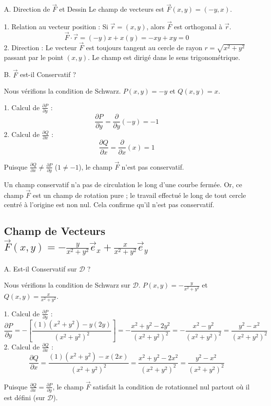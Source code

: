 \documentclass[french]{yLectureNote}
\renewcommand{\vec}{\overrightarrow}
\begin{document}
A. Direction de $\vec{F}$ et Dessin
Le champ de vecteurs est $\vec{F}(x,y) = (-y, x)$.

1.  Relation au vecteur position : Si $\vec{r} = (x, y)$, alors $\vec{F}$ est orthogonal à $\vec{r}$.
    $$
    \vec{F} \cdot \vec{r} = (-y)x + x(y) = -xy + xy = 0
    $$
2.  Direction : Le vecteur $\vec{F}$ est toujours tangent au cercle de rayon $r = \sqrt{x^2+y^2}$ passant par le point $(x,y)$. Le champ est dirigé dans le sens trigonométrique.



B. $\vec{F}$ est-il Conservatif ?

Nous vérifions la condition de Schwarz.
$P(x,y) = -y$ et $Q(x,y) = x$.

1.  Calcul de $\frac{\partial P}{\partial y}$ :
    $$
    \frac{\partial P}{\partial y} = \frac{\partial}{\partial y}(-y) = -1
    $$
2.  Calcul de $\frac{\partial Q}{\partial x}$ :
    $$
    \frac{\partial Q}{\partial x} = \frac{\partial}{\partial x}(x) = 1
    $$

Puisque $\frac{\partial Q}{\partial x} \ne \frac{\partial P}{\partial y}$ ($1 \ne -1$), le champ $\vec{F}$ n'est pas conservatif.

Un champ conservatif n'a pas de circulation le long d'une courbe fermée. Or, ce champ $\vec{F}$ est un champ de rotation pure ; le travail effectué le long de tout cercle centré à l'origine est non nul. Cela confirme qu'il n'est pas conservatif.


\subsection{Champ de Vecteurs $\vec{F}(x,y)=-\frac{y}{x^{2}+y^{2}}\vec{e}_{x}+\frac{x}{x^{2}+y^{2}}\vec{e}_{y}$}


A. Est-il Conservatif sur $\mathcal{D}$ ?

Nous vérifions la condition de Schwarz sur $\mathcal{D}$.
$P(x,y) = -\frac{y}{x^{2}+y^{2}}$ et $Q(x,y) = \frac{x}{x^{2}+y^{2}}$.

1.  Calcul de $\frac{\partial P}{\partial y}$ :
    $$
    \frac{\partial P}{\partial y} = -\left[\frac{(1)(x^2+y^2) - y(2y)}{(x^2+y^2)^2}\right] = -\frac{x^2+y^2-2y^2}{(x^2+y^2)^2} = -\frac{x^2-y^2}{(x^2+y^2)^2} = \frac{y^2-x^2}{(x^2+y^2)^2}
    $$
2.  Calcul de $\frac{\partial Q}{\partial x}$ :
    $$
    \frac{\partial Q}{\partial x} = \frac{(1)(x^2+y^2) - x(2x)}{(x^2+y^2)^2} = \frac{x^2+y^2-2x^2}{(x^2+y^2)^2} = \frac{y^2-x^2}{(x^2+y^2)^2}
    $$

Puisque $\frac{\partial Q}{\partial x} = \frac{\partial P}{\partial y}$, le champ $\vec{F}$ satisfait la condition de rotationnel nul partout où il est défini (sur $\mathcal{D}$).
\end{document}
